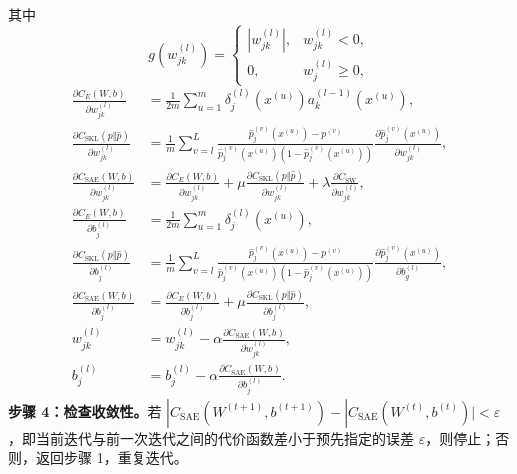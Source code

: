 其中
\[
g(w_{jk}^{(l)})=\begin{cases}|w_{jk}^{(l)}|,&w_{jk}^{(l)}<0,\\0,&w_j^{(l)}\geq0,\end{cases}
\]
\[
\begin{aligned}
\frac{\partial C_E(W,b)}{\partial w_{jk}^{(l)}}&=\frac1{2m}\sum_{u=1}^m\delta_j^{(l)}(x^{(u)})a_k^{(l-1)}(x^{(u)}),\\
\frac{\partial C_{\mathrm{SKL}}(p\Vert\widehat p)}{\partial w_{jk}^{(l)}}&=\frac1m\sum_{v=l}^L\frac{\widehat p_j^{(v)}(x^{(u)})-p^{(v)}}{\widehat p_j^{(v)}(x^{(u)})(1-\widehat p_j^{(v)}(x^{(u)}))}\frac{\partial\widehat p_j^{(v)}(x^{(u)})}{\partial w_{jk}^{(l)}},\\
\frac{\partial C_{\mathrm{SAE}}(W,b)}{\partial w_{jk}^{(l)}}&=\frac{\partial C_E(W,b)}{\partial w_{jk}^{(l)}}+\mu\frac{\partial C_{\mathrm{SKL}}(p\Vert\widehat p)}{\partial w_{jk}^{(l)}}+\lambda\frac{\partial C_{\mathrm{SW}}}{\partial w_{jk}^{(l)}},\\
\frac{\partial C_E(W,b)}{\partial b_j^{(l)}}&=\frac1{2m}\sum_{u=1}^m\delta_j^{(l)}(x^{(u)}),\\
\frac{\partial C_{\mathrm{SKL}}(p\Vert\widehat p)}{\partial b_j^{(l)}}&=\frac1m\sum_{v=l}^L\frac{\widehat p_j^{(v)}(x^{(u)})-p^{(v)}}{\widehat p_j^{(v)}(x^{(u)})(1-\widehat p_j^{(v)}(x^{(u)}))}\frac{\partial\widehat p_j^{(v)}(x^{(u)})}{\partial b_g^{(l)}},\\
\frac{\partial C_{\mathrm{SAE}}(W,b)}{\partial b_j^{(l)}}&=\frac{\partial C_E(W,b)}{\partial b_j^{(l)}}+\mu\frac{\partial C_{\mathrm{SKL}}(p\Vert\widehat p)}{\partial b_j^{(l)}},\\
w_{jk}^{(l)}&=w_{jk}^{(l)}-\alpha\frac{\partial C_{\mathrm{SAE}}(W,b)}{\partial w_{jk}^{(l)}},\\
b_j^{(l)}&=b_j^{(l)}-\alpha\frac{\partial C_{\mathrm{SAE}}(W,b)}{\partial b_j^{(l)}}.
\end{aligned}
\]
\noindent\textbf{步骤 4：检查收敛性。}若 $|C_{\mathrm{SAE}}(W^{(t+1)},b^{(t+1)})-|C_{\mathrm{SAE}}(W^{(t)},b^{(t)})|<\varepsilon$，即当前迭代与前一次迭代之间的代价函数差小于预先指定的误差 $\varepsilon$，则停止；否则，返回步骤 1，重复迭代。
